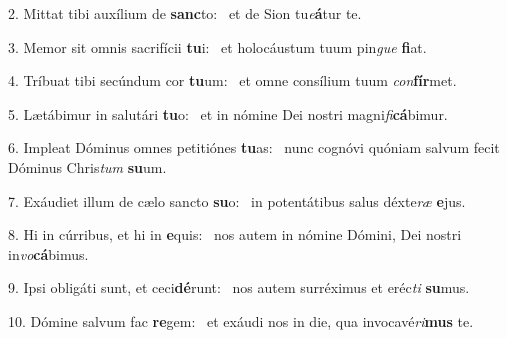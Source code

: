 2. Mittat tibi auxílium de \textbf{sanc}to: \ast\  et de Sion tu\textit{e}\textbf{á}tur te.\

3. Memor sit omnis sacrifícii \textbf{tu}i: \ast\  et holocáustum tuum pin\textit{gue} \textbf{fi}at.\

4. Tríbuat tibi secúndum cor \textbf{tu}um: \ast\  et omne consílium tuum \textit{con}\textbf{fír}met.\

5. Lætábimur in salutári \textbf{tu}o: \ast\  et in nómine Dei nostri magni\textit{fi}\textbf{cá}bimur.\

6. Impleat Dóminus omnes petitiónes \textbf{tu}as: \ast\  nunc cognóvi quóniam salvum fecit Dóminus Chris\textit{tum} \textbf{su}um.\

7. Exáudiet illum de cælo sancto \textbf{su}o: \ast\  in potentátibus salus déxte\textit{ræ} \textbf{e}jus.\

8. Hi in cúrribus, et hi in \textbf{e}quis: \ast\  nos autem in nómine Dómini, Dei nostri in\textit{vo}\textbf{cá}bimus.\

9. Ipsi obligáti sunt, et ceci\textbf{dé}runt: \ast\  nos autem surréximus et eréc\textit{ti} \textbf{su}mus.\

10. Dómine salvum fac \textbf{re}gem: \ast\  et exáudi nos in die, qua invocavé\textit{ri}\textbf{mus} te.\


